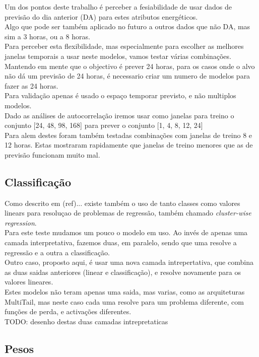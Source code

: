 Um dos pontos deste trabalho é perceber a fesiabilidade de usar dados de previsão do dia anterior (DA) para estes atributos energéticos.\\
Algo que pode ser também aplicado no futuro a outros dados que não DA, mas sim a 3 horas, ou a 8 horas.\\
Para perceber esta flexibilidade, mas especialmente para escolher as melhores janelas temporais a usar neste modelos, vamos testar várias combinações.\\
Mantendo em mente que o objectivo é prever 24 horas, para os casos onde o alvo não dá um previsão de 24 horas, é necessario criar um numero de modelos para fazer as 24 horas.\\
Para validação apenas é usado o espaço temporar previsto, e não multiplos modelos.\\
Dado as análises de autocorrelação iremos usar como janelas para treino o conjunto [24, 48, 98, 168] para prever o conjunto [1, 4, 8, 12, 24]\\
Para alem destes foram também testadas combinações com janelas de treino 8 e 12 horas. Estas mostraram rapidamente que janelas de treino menores que as de previsão funcionam muito mal.\\

\subsection{Classificação}

Como descrito em (ref)... existe também o uso de tanto classes como valores linears para resoluçao de problemas de regressão, também chamado \textit{cluster-wise regression}.\\
Para este teste mudamos um pouco o modelo em uso. Ao invés de apenas uma camada interpretativa, fazemos duas, em paralelo, sendo que uma resolve a regressão e a outra a classificação.\\
Outro caso, proposto aqui, é usar uma nova camada intrepertativa, que combina as duas saidas anteriores (linear e classificação), e resolve novamente para os valores lineares.\\
Estes modelos não teram apenas uma saida, mas varias, como as arquiteturas MultiTail, mas neste caso cada uma resolve para um problema diferente, com funções de perda, e activações diferentes.\\

TODO: desenho destas duas camadas intrepretaticas

\subsection{Pesos}

